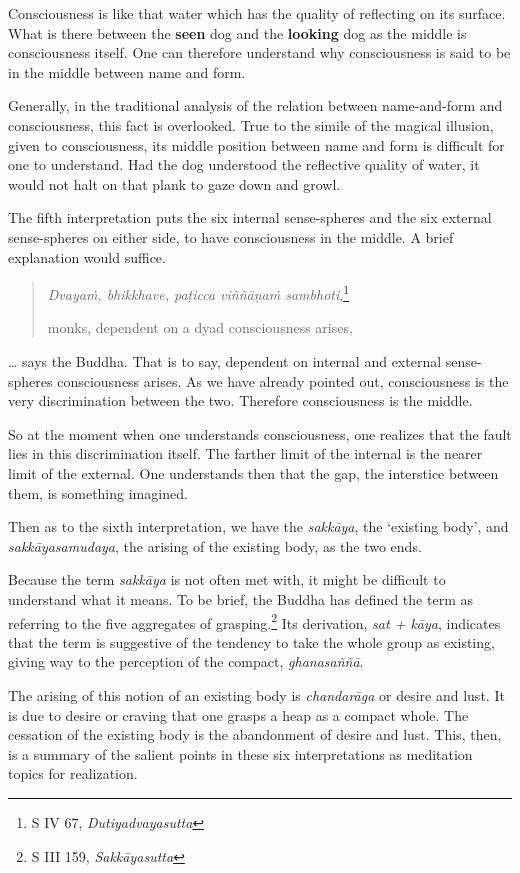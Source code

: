 Consciousness is like that water which has the quality of reflecting on its surface. What is there between the \textbf{seen} dog and the \textbf{looking} dog as the middle is consciousness itself. One can therefore understand why consciousness is said to be in the middle between name and form.

Generally, in the traditional analysis of the relation between name-and-form and consciousness, this fact is overlooked. True to the simile of the magical illusion, given to consciousness, its middle position between name and form is difficult for one to understand. Had the dog understood the reflective quality of water, it would not halt on that plank to gaze down and growl.

The fifth interpretation puts the six internal sense-spheres and the six external sense-spheres on either side, to have consciousness in the middle. A brief explanation would suffice.

\begin{quote}
\emph{Dvayaṁ, bhikkhave, paṭicca viññāṇaṁ sambhoti},\footnote{S IV 67, \emph{Dutiyadvayasutta}}

monks, dependent on a dyad consciousness arises,
\end{quote}

\ldots{} says the Buddha. That is to say, dependent on internal and external sense-spheres consciousness arises. As we have already pointed out, consciousness is the very discrimination between the two. Therefore consciousness is the middle.

So at the moment when one understands consciousness, one realizes that the fault lies in this discrimination itself. The farther limit of the internal is the nearer limit of the external. One understands then that the gap, the interstice between them, is something imagined.

Then as to the sixth interpretation, we have the \emph{sakkāya}, the `existing body', and \emph{sakkāyasamudaya}, the arising of the existing body, as the two ends.

Because the term \emph{sakkāya} is not often met with, it might be difficult to understand what it means. To be brief, the Buddha has defined the term as referring to the five aggregates of grasping.\footnote{S III 159, \emph{Sakkāyasutta}} Its derivation, \emph{sat + kāya}, indicates that the term is suggestive of the tendency to take the whole group as existing, giving way to the perception of the compact, \emph{ghanasaññā}.

The arising of this notion of an existing body is \emph{chandarāga} or desire and lust. It is due to desire or craving that one grasps a heap as a compact whole. The cessation of the existing body is the abandonment of desire and lust. This, then, is a summary of the salient points in these six interpretations as meditation topics for realization.

